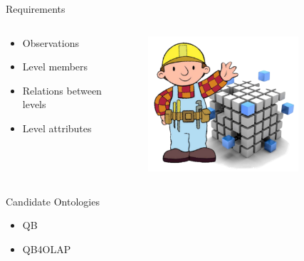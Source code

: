 \begin{frame}{Requirements}
\begin{columns}
\begin{block}{}
\begin{itemize}
    \item Observations
    \item Level members
    \item Relations between levels
    \item Level attributes
\end{itemize}
\end{block}
    \begin{figure}
        \includegraphics[width=0.8\textwidth]{images/cubeBuilder.png}
    \end{figure}
\end{columns}

\begin{block}{Candidate Ontologies}
\begin{itemize}
    \item QB%
    \item QB4OLAP%
\end{itemize}
\end{block}
\end{frame}

\newcommand{\patsec}{Patterns}
